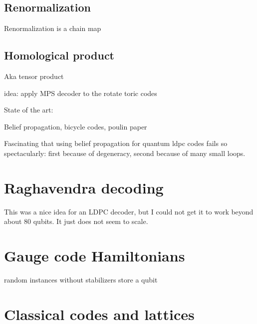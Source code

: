 \documentclass[12pt]{article}
\begin{document}
\subsection{Renormalization}

Renormalization is a chain map


\cite{Duclos-Cianci2010}

\subsection{Homological product}

Aka tensor product

idea: apply MPS decoder \cite{bravyi2014}
to the
rotate toric codes
\cite{kovalev2012}

State of the art:
\cite{kovalev2018}


Belief propagation, 
bicycle codes, 
poulin paper

Fascinating that using belief propagation
for quantum ldpc codes fails so spectacularly:
first because of degeneracy,
second because of many small loops.


\section{Raghavendra decoding}

This was a nice idea for an LDPC decoder,
but I could not get it to work beyond about 80 qubits.
It just does not seem to scale.

\cite{brown2016}

\section{Gauge code Hamiltonians}

random instances without stabilizers 
store a qubit


\section{Classical codes and lattices}


{}

\end{document}
